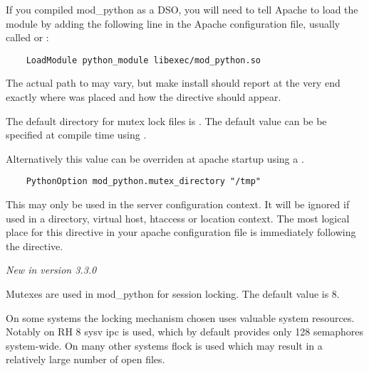 \begin{description}

\item {} 

  If you compiled mod_python as a DSO, you will need to tell Apache to
  load the module by adding the following line in the Apache
  configuration file, usually called  or
  :

  \begin{verbatim}
    LoadModule python_module libexec/mod_python.so
  \end{verbatim}

  The actual path to  may vary, but make install
  should report at the very end exactly where 
  was placed and how the  directive should appear.

\item {} 

  The default directory for mutex lock files is . The
  default value can be be specified at compile time using
  .

  Alternatively this value can be overriden at apache startup using 
  a .

  \begin{verbatim}
    PythonOption mod_python.mutex_directory "/tmp"
  \end{verbatim}

  This may only be used in the server configuration context.
  It will be ignored if used in a directory, virtual host,
  htaccess or location context. The most logical place for this 
  directive in your apache configuration file is immediately
  following the  directive.

 \emph{New in version 3.3.0}

\item {} 
  
  Mutexes are used in mod_python for session locking. The default
  value is 8.

  On some systems the locking mechanism chosen uses valuable
  system resources. Notably on RH 8 sysv ipc is used, which 
  by default provides only 128 semaphores system-wide.
  On many other systems flock is used which may result in a relatively
  large number of open files.


\end{description}
